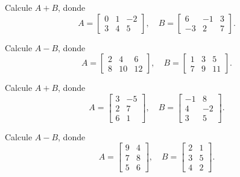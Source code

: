 \begin{ejercicio}
Calcule $A+B$, donde
\[
A=\begin{bmatrix} 0 & 1 & -2 \\ 3 & 4 & 5 \end{bmatrix}, \quad
B=\begin{bmatrix} 6 & -1 & 3 \\ -3 & 2 & 7 \end{bmatrix}.
\]
\end{ejercicio}
\muestraSolucion{
\[
A+B=\begin{bmatrix} 6 & 0 & 1 \\ 0 & 6 & 12 \end{bmatrix}.
\]
}

\begin{ejercicio}
Calcule $A-B$, donde
\[
A=\begin{bmatrix} 2 & 4 & 6 \\ 8 & 10 & 12 \end{bmatrix}, \quad
B=\begin{bmatrix} 1 & 3 & 5 \\ 7 & 9 & 11 \end{bmatrix}.
\]
\end{ejercicio}
\muestraSolucion{
\[
A-B=\begin{bmatrix} 1 & 1 & 1 \\ 1 & 1 & 1 \end{bmatrix}.
\]
}

\begin{ejercicio}
Calcule $A+B$, donde
\[
A=\begin{bmatrix} 3 & -5 \\ 2 & 7 \\ 6 & 1 \end{bmatrix}, \quad
B=\begin{bmatrix} -1 & 8 \\ 4 & -2 \\ 3 & 5 \end{bmatrix}.
\]
\end{ejercicio}
\muestraSolucion{
\[
A+B=\begin{bmatrix} 2 & 3 \\ 6 & 5 \\ 9 & 6 \end{bmatrix}.
\]
}

\begin{ejercicio}
Calcule $A-B$, donde
\[
A=\begin{bmatrix} 9 & 4 \\ 7 & 8 \\ 5 & 6 \end{bmatrix}, \quad
B=\begin{bmatrix} 2 & 1 \\ 3 & 5 \\ 4 & 2 \end{bmatrix}.
\]
\end{ejercicio}
\muestraSolucion{
\[
A-B=\begin{bmatrix} 7 & 3 \\ 4 & 3 \\ 1 & 4 \end{bmatrix}.
\]
}

